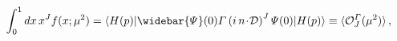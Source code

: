 \begin{equation}
\int_0^1 d x \, x^J f (x; \mu^2)
= \langle H(p) |
\widebar {\mit\Psi} (0)
{\mit\Gamma} \left( i \, n \!\cdot\! {\cal D} \right)^J
{\mit\Psi} (0)
| H(p) \rangle
\equiv \langle {\cal O}_J^{\mit\Gamma} (\mu^2)\rangle
\, ,
\label{O}
\end{equation}


